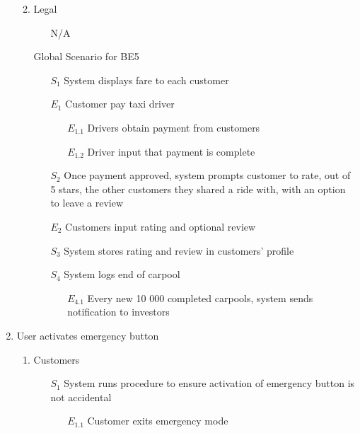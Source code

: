 \documentclass[]{article}
\begin{document}
\begin{enumerate}[{\textbf{BE}}1.]
\begin{enumerate}[{VP5}.1]
\begin{enumerate}
            \end{enumerate}
        \item Legal
            \begin{enumerate}
                \item[N/A]
            \end{enumerate}
        \item[Global] Scenario for BE5
            \begin{enumerate}
                \item[$S_1$] System displays fare to each customer
                \item[$E_1$] Customer pay taxi driver
                \begin{enumerate}
                    \item[$E_{1.1}$] Drivers obtain payment from customers
                    \item[$E_{1.2}$] Driver input that payment is complete
                \end{enumerate}
                \item[$S_2$] Once payment approved, system prompts customer to rate, out of 5 stars,  the other customers they shared a ride with, with an option to leave a review
                \item[$E_2$] Customers input rating and optional review
                \item[$S_3$] System stores rating and review in customers’ profile
                \item[$S_4$] System logs end of carpool
                \begin{enumerate}
                    \item[$E_{4.1}$] Every new 10 000 completed carpools, system sends notification to investors
                \end{enumerate}
            \end{enumerate}
    \end{enumerate}
    \item User activates emergency button
    \begin{enumerate}[{VP6}.1]
        \item Customers
            \begin{enumerate}
                \item[$S_1$] System runs procedure to ensure activation of emergency button is not accidental
                \begin{enumerate}
                    \item[$E_{1.1}$] Customer exits emergency mode

\end{enumerate}
\end{enumerate}
\end{enumerate}
\end{enumerate}
\end{document}

